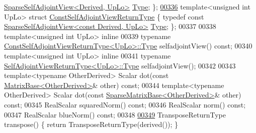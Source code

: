 \begin{DoxyCode}
      \hyperlink{group___sparse_core___module_class_eigen_1_1_sparse_self_adjoint_view}{SparseSelfAdjointView<Derived, UpLo>} \hyperlink{group___sparse_core___module_class_eigen_1_1_sparse_self_adjoint_view}{Type}; \};
\hyperlink{struct_eigen_1_1_sparse_matrix_base_1_1_const_self_adjoint_view_return_type}{00336}     \textcolor{keyword}{template}<\textcolor{keywordtype}{unsigned} \textcolor{keywordtype}{int} UpLo> \textcolor{keyword}{struct }\hyperlink{struct_eigen_1_1_sparse_matrix_base_1_1_const_self_adjoint_view_return_type}{ConstSelfAdjointViewReturnType} \{ \textcolor{keyword}{
      typedef} \textcolor{keyword}{const} \hyperlink{group___sparse_core___module_class_eigen_1_1_sparse_self_adjoint_view}{SparseSelfAdjointView<const Derived, UpLo>} 
      \hyperlink{group___sparse_core___module_class_eigen_1_1_sparse_self_adjoint_view}{Type}; \};
00337 
00338     \textcolor{keyword}{template}<\textcolor{keywordtype}{unsigned} \textcolor{keywordtype}{int} UpLo> \textcolor{keyword}{inline} 
00339     \textcolor{keyword}{typename} \hyperlink{group___sparse_core___module_class_eigen_1_1_sparse_self_adjoint_view}{ConstSelfAdjointViewReturnType<UpLo>::Type} 
      selfadjointView() \textcolor{keyword}{const};
00340     \textcolor{keyword}{template}<\textcolor{keywordtype}{unsigned} \textcolor{keywordtype}{int} UpLo> \textcolor{keyword}{inline}
00341     \textcolor{keyword}{typename} \hyperlink{group___sparse_core___module_class_eigen_1_1_sparse_self_adjoint_view}{SelfAdjointViewReturnType<UpLo>::Type} selfadjointView();
00342 
00343     \textcolor{keyword}{template}<\textcolor{keyword}{typename} OtherDerived> Scalar dot(\textcolor{keyword}{const} \hyperlink{group___core___module_class_eigen_1_1_matrix_base}{MatrixBase<OtherDerived>}& 
      other) \textcolor{keyword}{const};
00344     \textcolor{keyword}{template}<\textcolor{keyword}{typename} OtherDerived> Scalar dot(\textcolor{keyword}{const} 
      \hyperlink{group___sparse_core___module_class_eigen_1_1_sparse_matrix_base}{SparseMatrixBase<OtherDerived>}& other) \textcolor{keyword}{const};
00345     RealScalar squaredNorm() \textcolor{keyword}{const};
00346     RealScalar norm()  \textcolor{keyword}{const};
00347     RealScalar blueNorm() \textcolor{keyword}{const};
00348 
\hyperlink{group___sparse_core___module_a6557dcd3512c07370630d5ce0c3fbd3e}{00349}     TransposeReturnType transpose() \{ \textcolor{keywordflow}{return} TransposeReturnType(derived()); \}

\end{DoxyCode}
